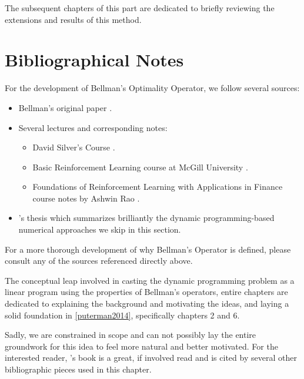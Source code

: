 The subsequent chapters of this part are dedicated to briefly reviewing the extensions
and results of this method.


\section{Bibliographical Notes}

For the development of Bellman's Optimality Operator, we follow several sources:
\begin{itemize}
    \item Bellman's original paper \cite{bellman1957}.
    \item Several lectures and corresponding notes:
    \begin{itemize}
        \item David Silver's Course \cite[Lects.~2-3]{silver2015}.
        \item Basic Reinforcement Learning course at McGill University
            \cite[Lect.~2]{moisescu-parejaa}.
        \item Foundations of Reinforcement Learning with Applications in Finance
            course notes by Ashwin Rao \cite[Lect. on Jan 15 2019]{rao2022}.
    \end{itemize}
    \item \citeauthor{nadeemward2021}'s thesis \cite{nadeemward2021} which
        summarizes brilliantly the dynamic programming-based numerical
        approaches we skip in this section.
\end{itemize}

For a more thorough development of why Bellman's Operator is defined, please
consult any of the sources referenced directly above.

The conceptual leap involved in casting the dynamic programming problem as a
linear program using the properties of Bellman's operators, entire chapters are
dedicated to explaining the background and motivating the ideas, and laying a
solid foundation in \ref{puterman2014}, specifically chapters 2 and 6.

Sadly, we are constrained in scope and can not possibly lay the entire
groundwork for this idea to feel more natural and better motivated. For the
interested reader, \citeauthor{puterman2014}'s book is a great, if involved
read and is cited by several other bibliographic pieces used in this chapter.